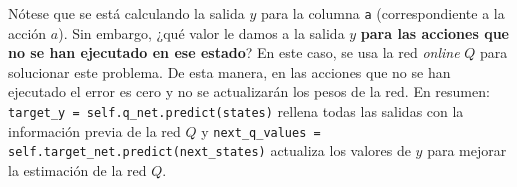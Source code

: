 \documentclass{article}
\begin{document}
Nótese que se está calculando la salida $y$ para la columna \texttt{a} (correspondiente a la acción $a$).
Sin embargo, ¿qué valor le damos a la salida $y$ \textbf{para las acciones que no se han ejecutado en ese estado}? En este caso, se usa la red \textit{online} $Q$ para solucionar este problema. De esta manera, en las acciones que no se han ejecutado el error es cero y no se actualizarán los pesos de la red. En resumen: \texttt{target\_y = self.q\_net.predict(states)} rellena todas las salidas con la información previa de la red $Q$ y \texttt{next\_q\_values = self.target\_net.predict(next\_states)} actualiza los valores de $y$ para mejorar la estimación de la red $Q$.


\end{document}
